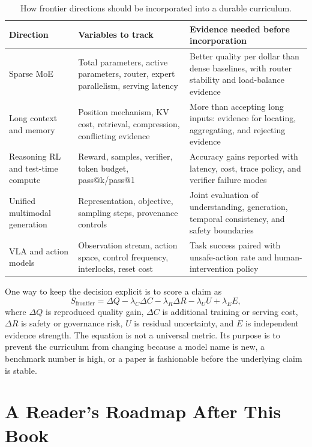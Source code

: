 \begin{table}[t]
\centering
\caption{How frontier directions should be incorporated into a durable curriculum.}
\label{tab:frontier-evidence-matrix}
\begin{tabular}{p{}p{}p{}}
\toprule
Direction & Variables to track & Evidence needed before incorporation \\
\midrule
Sparse MoE & Total parameters, active parameters, router, expert parallelism, serving latency & Better quality per dollar than dense baselines, with router stability and load-balance evidence \\
Long context and memory & Position mechanism, KV cost, retrieval, compression, conflicting evidence & More than accepting long inputs: evidence for locating, aggregating, and rejecting evidence \\
Reasoning RL and test-time compute & Reward, samples, verifier, token budget, pass@k/pass@1 & Accuracy gains reported with latency, cost, trace policy, and verifier failure modes \\
Unified multimodal generation & Representation, objective, sampling steps, provenance controls & Joint evaluation of understanding, generation, temporal consistency, and safety boundaries \\
VLA and action models & Observation stream, action space, control frequency, interlocks, reset cost & Task success paired with unsafe-action rate and human-intervention policy \\
\bottomrule
\end{tabular}
\end{table}

One way to keep the decision explicit is to score a claim as
\begin{equation}
  S_{\mathrm{frontier}}
  =
  \Delta Q
  - \lambda_C \Delta C
  - \lambda_R \Delta R
  - \lambda_U U
  + \lambda_E E,
\end{equation}
where $\Delta Q$ is reproduced quality gain, $\Delta C$ is additional training or serving cost, $\Delta R$ is safety or governance risk, $U$ is residual uncertainty, and $E$ is independent evidence strength. The equation is not a universal metric. Its purpose is to prevent the curriculum from changing because a model name is new, a benchmark number is high, or a paper is fashionable before the underlying claim is stable.

\section{A Reader's Roadmap After This Book}
\label{sec:reader-roadmap}

